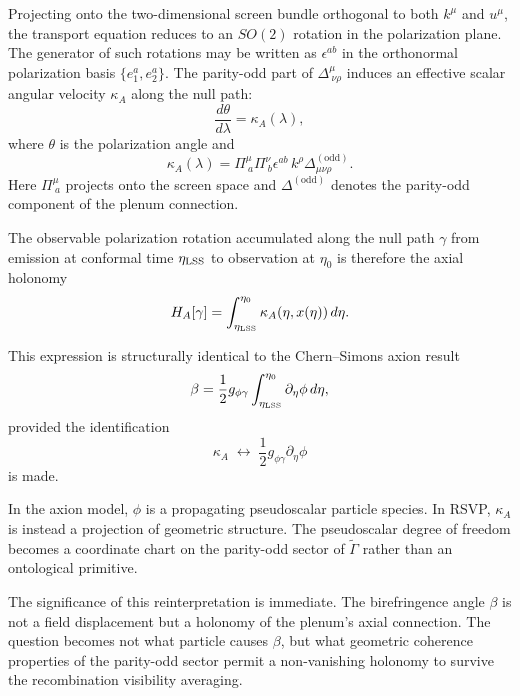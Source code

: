 \documentclass[12pt]{article}
\begin{document}
Projecting onto the two-dimensional screen bundle orthogonal to both $k^\mu$ and $u^\mu$, the transport equation reduces to an $SO(2)$ rotation in the polarization plane. The generator of such rotations may be written as $\epsilon^{ab}$ in the orthonormal polarization basis $\{e_1^a, e_2^a\}$. The parity-odd part of $\Delta^\mu_{\ \nu\rho}$ induces an effective scalar angular velocity $\kappa_A$ along the null path:
\begin{equation}
\frac{d\theta}{d\lambda} = \kappa_A(\lambda),
\end{equation}
where $\theta$ is the polarization angle and
\begin{equation}
\kappa_A(\lambda)
=
\Pi^\mu_{\ a}
\Pi^\nu_{\ b}
\epsilon^{ab}
\, k^\rho
\Delta_{\mu\nu\rho}^{(\text{odd})}.
\end{equation}
Here $\Pi^\mu_{\ a}$ projects onto the screen space and $\Delta^{(\text{odd})}$ denotes the parity-odd component of the plenum connection.

The observable polarization rotation accumulated along the null path $\gamma$ from emission at conformal time $\eta_{\rm LSS}$ to observation at $\eta_0$ is therefore the axial holonomy
\begin{equation}
H_A[\gamma]
=
\int_{\eta_{\rm LSS}}^{\eta_0}
\kappa_A(\eta, x(\eta)) \, d\eta.
\end{equation}

This expression is structurally identical to the Chern--Simons axion result
\begin{equation}
\beta
=
\frac{1}{2} g_{\phi\gamma}
\int_{\eta_{\rm LSS}}^{\eta_0}
\partial_\eta \phi \, d\eta,
\end{equation}
provided the identification
\begin{equation}
\kappa_A
\;\longleftrightarrow\;
\frac{1}{2} g_{\phi\gamma} \partial_\eta \phi
\end{equation}
is made.

In the axion model, $\phi$ is a propagating pseudoscalar particle species. In RSVP, $\kappa_A$ is instead a projection of geometric structure. The pseudoscalar degree of freedom becomes a coordinate chart on the parity-odd sector of $\widetilde{\Gamma}$ rather than an ontological primitive.

The significance of this reinterpretation is immediate. The birefringence angle $\beta$ is not a field displacement but a holonomy of the plenum's axial connection. The question becomes not what particle causes $\beta$, but what geometric coherence properties of the parity-odd sector permit a non-vanishing holonomy to survive the recombination visibility averaging.
\end{document}
